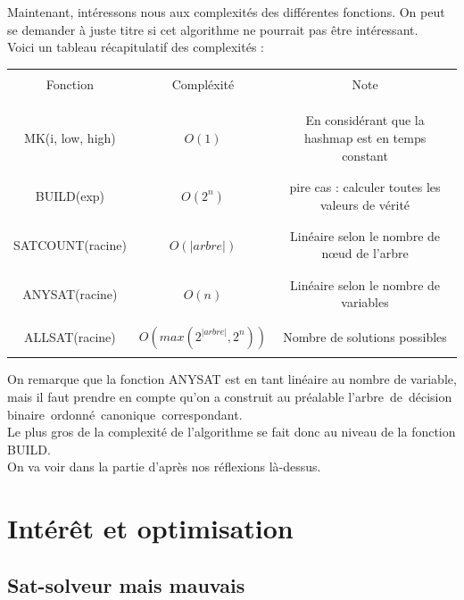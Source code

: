 \documentclass[a4paper, oneside]{report}
\newcommand{\adb}{arbre~de~décision binaire~}
\newcommand{\adbo}{\adb ordonné~}
\newcommand{\adboc}{\adbo canonique~}
\begin{document}
Maintenant, intéressons nous aux complexités des différentes fonctions. On peut se demander à juste titre si cet algorithme ne pourrait pas être intéressant.\\
Voici un tableau récapitulatif des complexités :\\
\begin{center}
\begin{tabular}{|c|c|c|}
\hline 
&&\\
Fonction & Compléxité & Note \\ 
&&\\
&&\\
\hline 
&&\\
MK(i, low, high) & $O(1)$ & En considérant que la hashmap est en temps constant \\ 
&&\\
\hline 
&&\\
BUILD(exp) & $O(2^n)$ & pire cas : calculer toutes les valeurs de vérité \\ 
&&\\
\hline 
&&\\
SATCOUNT(racine) & $O(|arbre|)$ & Linéaire selon le nombre de nœud de l'arbre \\ 
&&\\
\hline 
&&\\
ANYSAT(racine) & $O(n)$ & Linéaire selon le nombre de variables \\ 
&&\\
\hline 
&&\\
ALLSAT(racine) & $O(max(2^{|arbre|}, 2^n))$ & Nombre de solutions possibles \\ 
&&\\
\hline 
\end{tabular} 
\end{center}

On remarque que la fonction ANYSAT est en tant linéaire au nombre de variable, mais il faut prendre en compte qu'on a construit au préalable l'\adboc correspondant.\\
Le plus gros de la complexité de l'algorithme se fait donc au niveau de la fonction BUILD.\\
On va voir dans la partie d'après nos réflexions là-dessus.

\chapter{Intérêt et optimisation}

\section{Sat-solveur mais mauvais}
\end{document}
